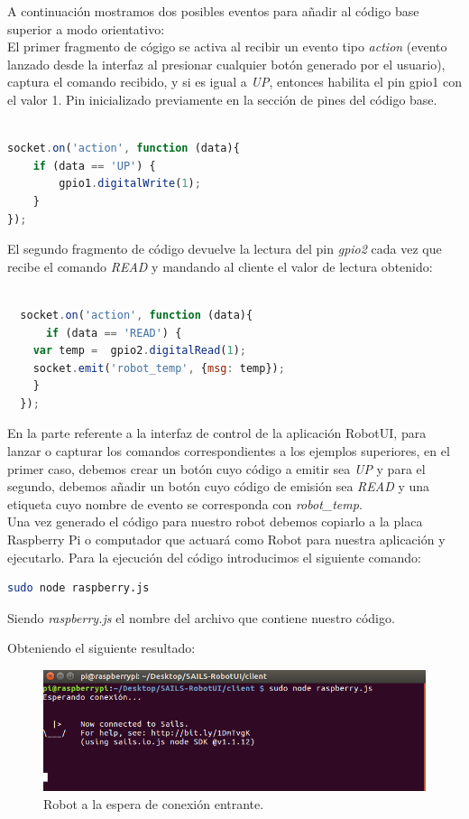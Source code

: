 A continuación mostramos dos posibles eventos para añadir al código base superior a modo orientativo:\\

El primer fragmento de cógigo se activa al recibir un evento tipo \emph{action} (evento lanzado desde la interfaz al presionar cualquier botón generado por el usuario), captura el comando recibido,
y si es igual a \emph{UP}, entonces habilita el pin gpio1 con el valor 1. Pin inicializado previamente en la sección de pines del código base.\\

\begin{lstlisting}[language=JavaScript]

socket.on('action', function (data){
    if (data == 'UP') {
        gpio1.digitalWrite(1);
    }
});

\end{lstlisting}

El segundo fragmento de código devuelve la lectura del pin \emph{gpio2} cada vez que recibe el comando \emph{READ} y mandando al cliente el valor de lectura obtenido:\\

\begin{lstlisting}[language=JavaScript]

  socket.on('action', function (data){
      if (data == 'READ') {
	var temp =  gpio2.digitalRead(1);
	socket.emit('robot_temp', {msg: temp});
    }
  });
\end{lstlisting}
 

En la parte referente a la interfaz de control de la aplicación RobotUI, para lanzar o capturar los comandos correspondientes a los ejemplos superiores, en el primer caso, debemos crear un botón 
cuyo código a emitir sea \emph{UP} y para el segundo, debemos añadir un botón cuyo código de emisión sea \emph{READ} y una etiqueta cuyo nombre de evento se corresponda con \emph{robot\_temp}.\\

Una vez generado el código para nuestro robot debemos copiarlo a la placa Raspberry Pi o computador que actuará como Robot para nuestra aplicación y ejecutarlo. Para la ejecución del código
introducimos el siguiente comando:\\

\begin{lstlisting}[language=bash]
  sudo node raspberry.js
\end{lstlisting}

Siendo \emph{raspberry.js} el nombre del archivo que contiene nuestro código.

Obteniendo el siguiente resultado:

\begin{figure}[H]
  \begin{center}
    \includegraphics[scale=.6]{imagenes/manual-usuario/espera-conexion.png}
  \end{center}
  \caption{ Robot a la espera de conexión entrante.}
  \label{website:pagina-principal}
\end{figure}

